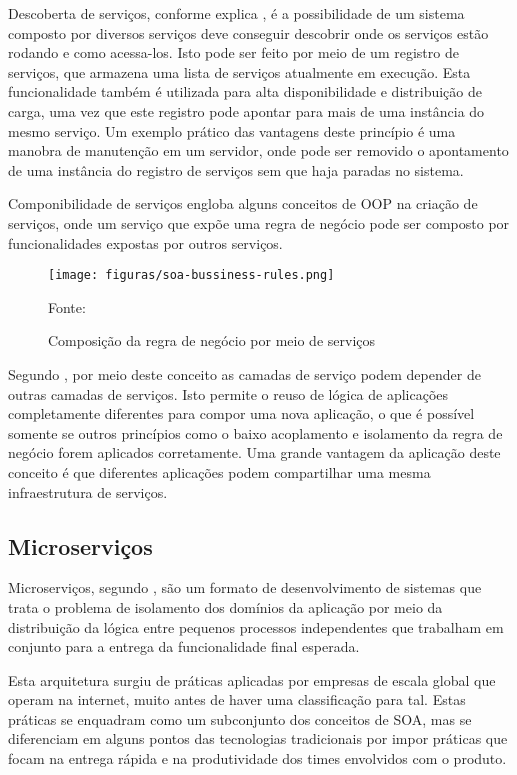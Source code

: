 Descoberta de serviços, conforme explica , é a
possibilidade de um sistema composto por diversos serviços deve conseguir
descobrir onde os serviços estão rodando e como acessa-los. Isto pode ser
feito por meio de um registro de serviços, que armazena uma lista de serviços
atualmente em execução. Esta funcionalidade também é utilizada para alta
disponibilidade e distribuição de carga, uma vez que este registro pode
apontar para mais de uma instância do mesmo serviço. Um exemplo prático das
vantagens deste princípio é uma manobra de manutenção em um servidor, onde
pode ser removido o apontamento de uma instância do registro de serviços sem
que haja paradas no sistema.

Componibilidade de serviços engloba alguns conceitos de \ac{OOP} na criação
de serviços, onde um serviço que expõe uma regra de negócio pode ser composto
por funcionalidades expostas por outros serviços.

\begin{figure}[H]
	\centering
	\caption{Composição da regra de negócio por meio de serviços}
	\texttt{[image: figuras/soa-bussiness-rules.png]}

	\label{fig:soa-bussiness-rules}
	\footnotesize Fonte: 
\end{figure}

Segundo , por meio deste conceito as camadas de serviço
podem depender de outras camadas de serviços. Isto permite o reuso de lógica
de aplicações completamente diferentes para compor uma nova aplicação, o que
é possível somente se outros princípios como o baixo acoplamento e isolamento
da regra de negócio forem aplicados corretamente. Uma grande vantagem da
aplicação deste conceito é que diferentes aplicações podem compartilhar uma
mesma infraestrutura de serviços.

\subsection{Microserviços}

Microserviços, segundo , são um formato de
desenvolvimento de sistemas que trata o problema de isolamento dos domínios
da aplicação por meio da distribuição da lógica entre pequenos processos
independentes que trabalham em conjunto para a entrega da funcionalidade
final esperada.

Esta arquitetura surgiu de práticas aplicadas por empresas de escala global que
operam na internet, muito antes de haver uma classificação para tal. Estas
práticas se enquadram como um subconjunto dos conceitos de \ac{SOA}, mas se
diferenciam em alguns pontos das tecnologias tradicionais por impor práticas
que focam na entrega rápida e na produtividade dos times envolvidos com
o produto.

